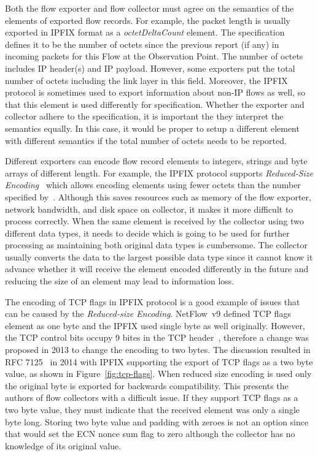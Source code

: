 Both the flow exporter and flow collector must agree on the semantics of the elements of exported flow records. For example, the packet length is usually exported in IPFIX format as a \emph{octetDeltaCount} element. The specification~\cite{IANA-2017-IP} defines it to be the number of octets since the previous report (if any) in incoming packets for this Flow at the Observation Point. The number of octets includes IP header(s) and IP payload. However, some exporters put the total number of octets including the link layer in this field. Moreover, the IPFIX protocol is sometimes used to export information about non-IP flows as well, so that this element is used differently for specification. Whether the exporter and collector adhere to the specification, it is important the they interpret the semantics equally. In this case, it would be proper to setup a different element with different semantics if the total number of octets needs to be reported.

Different exporters can encode flow record elements to integers, strings and byte arrays of different length. For example, the IPFIX protocol supports \emph{Reduced-Size Encoding}~\cite{rfc7011} which allows encoding elements using fewer octets than the number specified by~\cite{IANA-2017-IP}. Although this saves resources such as memory of the flow exporter, network bandwidth, and disk space on collector, it makes it more difficult to process correctly. When the same element is received by the collector using two different data types, it needs to decide which is going to be used for further processing as maintaining both original data types is cumbersome. The collector usually converts the data to the largest possible data type since it cannot know it advance whether it will receive the element encoded differently in the future and reducing the size of an element may lead to information loss.

The encoding of TCP flags in IPFIX protocol is a good example of issues that can be caused by the \emph{Reduced-size Encoding}. NetFlow~v9 defined TCP flags element as one byte and the IPFIX used single byte as well originally. However, the TCP control bits occupy 9 bites in the TCP header~\cite{rfc3540}, therefore a change was proposed in 2013 to change the encoding to two bytes. The discussion resulted in RFC 7125~\cite{rfc7125} in 2014 with IPFIX supporting the export of TCP flags as a two byte value, as shown in Figure~\ref{fig:tcp-flags}. When reduced size encoding is used only the original byte is exported for backwards compatibility. This presents the authors of flow collectors with a difficult issue. If they support TCP flags as a two byte value, they must indicate that the received element was only a single byte long. Storing two byte value and padding with zeroes is not an option since that would set the ECN nonce sum flag to zero although the collector has no knowledge of its original value.

